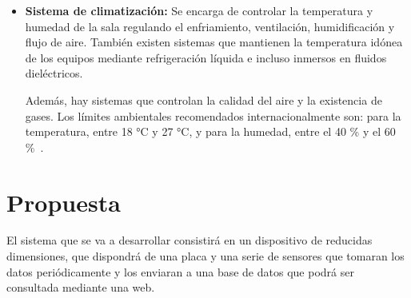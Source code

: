 \begin{itemize}
	\item \textbf{Sistema de climatización:} Se encarga de controlar la temperatura y humedad de la sala regulando el enfriamiento, ventilación, humidificación y flujo de aire. También existen sistemas que mantienen la temperatura idónea de los equipos mediante refrigeración líquida e incluso inmersos en fluidos dieléctricos.

	Además, hay sistemas que controlan la calidad del aire y la existencia de gases. Los límites ambientales recomendados internacionalmente son: para la temperatura, entre 18 °C y 27 °C, y para la humedad, entre el 40 \% y el 60 \%~\cite{noauthor_recommended_nodate}.
\end{itemize}

\iffalse
\section{Soluciones actuales}\label{sec:soluciones-actuales}
En esta sección se presentarán cuáles son las alternativas que existen actualmente y que tienen el mismo propósito que el sistema que se va a desarrollar en este proyecto.

Como se trata de un sistema de control ambiental y videovigilancia no cubriremos todos los aspectos de seguridad que se han presentado en la \autoref{sec:seguridad_fisica_CPD}, pero sí se desarrollaran: Seguimiento dentro de la sala, Medidas contra incendios y Sistema de climatización.

INCOMPLETO, FALTA ENCONTRARLAS

\section{Critica al Estado del arte}\label{sec:critica-al-estado-del-arte}
PUNTOS FUERTES DE CADA UNA
\fi

\section{Propuesta}\label{sec:propuesta}
El sistema que se va a desarrollar consistirá en un dispositivo de reducidas dimensiones, que dispondrá de una placa y una serie de sensores que tomaran los datos periódicamente y los enviaran a una base de datos que podrá ser consultada mediante una web.

